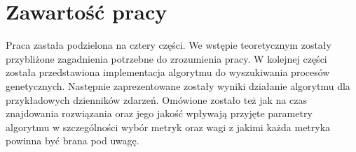 \section{Zawartość pracy}
\label{sec:zawartoscPracy}

Praca zastała podzielona na cztery części. We wstępie teoretycznym zostały przybliżone zagadnienia potrzebne do zrozumienia pracy. W kolejnej części została przedstawiona implementacja algorytmu do wyszukiwania procesów genetycznych. Następnie zaprezentowane zostały wyniki działanie algorytmu dla przykładowych dzienników zdarzeń. Omówione zostało też jak na czas znajdowania rozwiązania oraz jego jakość wpływają przyjęte parametry algorytmu w szczególności wybór metryk oraz wagi z jakimi każda metryka powinna być brana pod uwagę.  


















